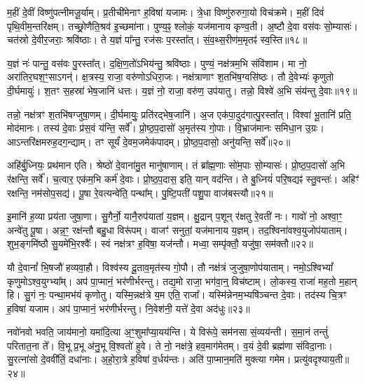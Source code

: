 म॒हीं दे॒वीं विष्णु॑पत्नीमजू॒र्याम्।
प्र॒तीची॑मेनाꣳ ह॒विषा॑ यजामः।
त्रे॒धा विष्णु॑रुरुगा॒यो विच॑क्रमे।
म॒हीं दिवं॑ पृथि॒वीम॒न्तरि॑क्षम्।
तच्छ्रो॒णैति॒श्रव॑ इ॒च्छमा॑ना।
पुण्य॒ꣴ॒ श्लोकं॒ यज॑मानाय कृण्व॒ती।
अ॒ष्टौ दे॒वा वस॑वः सो॒म्यासः॑।
चत॑स्रो दे॒वीर॒जराः॒ श्रवि॑ष्ठाः।
ते य॒ज्ञं पा᳚न्तु॒ रज॑सः प॒रस्ता᳚त्।
सं॒व॒थ्स॒रीण॑म॒मृतꣴ॑ स्व॒स्ति॥१८॥\ip

य॒ज्ञं नः॑ पान्तु॒ वस॑वः पु॒रस्ता᳚त्।
द॒क्षि॒ण॒तो॑\-ऽभिय॑न्तु॒ श्रवि॑ष्ठाः।
पुण्यं॒ नक्ष॑त्रम॒भि संवि॑शाम।
मा नो॒ अरा॑तिर॒घश॒ꣳ॒सा\-ऽगन्॑।
क्ष॒त्रस्य॒ राजा॒ वरु॑णो\-ऽधिरा॒जः।
नक्ष॑त्राणाꣳ श॒तभि॑ष॒ग्वसि॑ष्ठः।
तौ दे॒वेभ्यः॑ कृणुतो दी॒र्घमायुः॑।
श॒तꣳ स॒हस्रा॑ भेष॒जानि॑ धत्तः।
य॒ज्ञं नो॒ राजा॒ वरु॑ण॒ उप॑यातु।
तन्नो॒ विश्वे॑ अ॒भि संय॑न्तु दे॒वाः॥१९॥\ip

तन्नो॒ नक्ष॑त्रꣳ श॒तभि॑षग्जुषा॒णम्।
दी॒र्घमायुः॒ प्रति॑\-रद्भेष॒जानि॑।
अ॒ज एक॑पा॒दुद॑गात्पु॒र\-स्ता᳚त्।
विश्वा॑ भू॒तानि॑ प्रति॒ मोद॑मानः।
तस्य॑ दे॒वाः प्र॑स॒वं य॑न्ति॒ सर्वे᳚।
प्रो॒ष्ठ॒प॒दासो॑ अ॒मृत॑स्य गो॒पाः।
वि॒भ्राज॑मानः समिधा॒न उ॒ग्रः।
आऽन्तरि॑क्षमरुह॒दग॒न्द्याम्।
तꣳ सूर्यं॑ दे॒वम॒जमेक॑पादम्।
प्रो॒ष्ठ॒प॒दासो॒ अनु॑यन्ति॒ सर्वे᳚॥२०॥\ip

अहि॑र्बु॒ध्नियः॒ प्रथ॑मान एति।
श्रेष्ठो॑ दे॒वाना॑मु॒त मानु॑षाणाम्।
तं ब्रा᳚ह्म॒णाः सो॑म॒पाः सो॒म्यासः॑।
प्रो॒ष्ठ॒प॒दासो॑ अ॒भि र॑क्षन्ति॒ सर्वे᳚।
च॒त्वार॒ एक॑म॒भि कर्म॑ दे॒वाः।
प्रो॒ष्ठ॒प॒दास॒ इति॒ यान् वद॑न्ति।
ते बु॒ध्नियं॑ परि॒षद्यꣴ॑ स्तु॒वन्तः॑।
अहिꣳ॑ रक्षन्ति॒ नम॑सोप॒सद्य॑।
पू॒षा रे॒वत्यन्वे॑ति॒ पन्था᳚म्।
पु॒ष्टि॒पती॑ पशु॒पा वाज॑बस्त्यौ॥२१॥\ip

इ॒मानि॑ ह॒व्या प्रय॑ता जुषा॒णा।
सु॒गैर्नो॒ यानै॒रुप॑यातां य॒ज्ञम्।
क्षु॒द्रान् प॒शून् र॑क्षतु रे॒वती॑ नः।
गावो॑ नो॒ अश्वा॒ꣳ॒ अन्वे॑तु पू॒षा।
अन्न॒ꣳ॒ रक्ष॑न्तौ बहु॒धा विरू॑पम्।
वाजꣳ॑ सनुतां॒ यज॑मानाय य॒ज्ञम्।
तद॒श्विना॑वश्व॒युजोप॑याताम्।
शुभ॒ङ्गमि॑ष्ठौ सु॒यमे॑भि॒रश्वैः᳚।
स्वं नक्ष॑त्रꣳ ह॒विषा॒ यज॑न्तौ।
मध्वा॒ सम्पृ॑क्तौ॒ यजु॑षा॒ सम॑क्तौ॥२२॥\ip

यौ दे॒वानां᳚ भि॒षजौ॑ हव्यवा॒हौ।
विश्व॑स्य दू॒ताव॒मृत॑स्य गो॒पौ।
तौ नक्ष॑त्रं जुजुषा॒णोप॑याताम्।
नमो॒ऽश्विभ्यां᳚ कृणुमो\-ऽश्व॒युग्भ्या᳚म्।
अप॑ पा॒प्मानं॒ भर॑णीर्भरन्तु।
तद्य॒मो राजा॒ भग॑वा॒न्॒ विच॑ष्टाम्।
लो॒कस्य॒ राजा॑ मह॒तो म॒हान् हि।
सु॒गं नः॒ पन्था॒मभ॑यं कृणोतु।
यस्मि॒न्नक्ष॑त्रे य॒म एति॒ राजा᳚।
यस्मि॑न्नेनम॒भ्यषि॑ञ्चन्त दे॒वाः।
तद॑स्य चि॒त्रꣳ ह॒विषा॑ यजाम।
अप॑ पा॒प्मानं॒ भर॑णीर्भरन्तु।
नि॒वेश॑नी॒ यत्ते॑ दे॒वा अद॑धुः॥२३॥\ip\anuvakamend[त॒तार॒ मह्यं॑ प्रास॒चीर्या या᳚न्तु य॒ज्ञं वाचꣴ॑ स्व॒स्ति दे॒वा अनु॑यन्ति॒ सर्वे॒ वाज॑बस्त्यौ॒ सम॑क्तौ दे॒वास्त्रीणि॑ च]

नवो॑नवो भवति॒ जाय॑मानो॒ यमा॑दि॒त्या अ॒ꣳ॒शुमा᳚प्या॒यय॑न्ति।
ये विरू॑पे॒ सम॑नसा सं॒व्यय॑न्ती।
स॒मा॒नं तन्तुं॑ परितात॒ना ते᳚।
वि॒भू प्र॒भू अ॑नु॒भू वि॒श्वतो॑ हुवे।
ते नो॒ नक्ष॑त्रे॒ हव॒माग॑मेतम्।
व॒यं दे॒वी ब्रह्म॑णा संविदा॒नाः।
सु॒रत्ना॑सो दे॒ववी॑तिं॒ दधा॑नाः।
अ॒हो॒रा॒त्रे ह॒विषा॑ व॒र्धय॑न्तः।
अति॑ पा॒प्मान॒मति॑ मुक्त्या गमेम।
प्रत्यु॑वदृश्याय॒ती॥२४॥\ip

